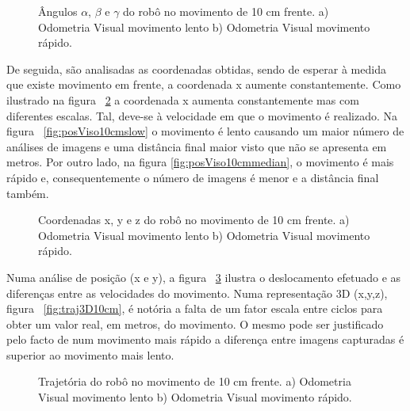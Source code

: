 \begin{figure}[h!]
	\centering
	\qquad
	\caption{Ângulos $\alpha$, $\beta$ e $\gamma$ do robô  no movimento de 10 cm frente. a) Odometria Visual movimento lento b) Odometria Visual movimento rápido.}
	\label{fig:ang10cm}
\end{figure}


De seguida, são analisadas as coordenadas obtidas, sendo de esperar à medida que existe movimento em frente, a coordenada x aumente constantemente. Como ilustrado na figura ~\ref{fig:pos10cm} a coordenada x aumenta constantemente mas com diferentes escalas. Tal, deve-se à velocidade em que o movimento é realizado. Na figura ~\ref{fig:posViso10cmslow} o movimento é lento causando um maior número de análises de imagens e uma distância final maior visto que não se apresenta em metros. Por outro lado, na figura \ref{fig:posViso10cmmedian}, o movimento é mais rápido e, consequentemente o número de imagens é menor e a distância final também.


\begin{figure}[h!]
	\centering
	\qquad
	\caption{Coordenadas x, y e z do robô no movimento de 10 cm frente. a) Odometria Visual movimento lento b) Odometria Visual movimento rápido.}
	\label{fig:pos10cm}
\end{figure}


Numa análise de posição (x e y), a figura ~\ref{fig:traj10cm} ilustra o deslocamento efetuado e as diferenças entre as velocidades do movimento. Numa representação 3D (x,y,z), figura ~\ref{fig:traj3D10cm}, é notória a falta de um fator escala entre ciclos para obter um valor real, em metros, do movimento.  O mesmo pode ser justificado pelo facto de num  movimento mais rápido a diferença entre imagens capturadas é superior ao movimento mais lento. 


\begin{figure}[h!]
	\centering
	\qquad
	\caption{Trajetória do robô no movimento de 10 cm frente. a) Odometria Visual movimento lento b) Odometria Visual movimento rápido.}
	\label{fig:traj10cm}
\end{figure}




